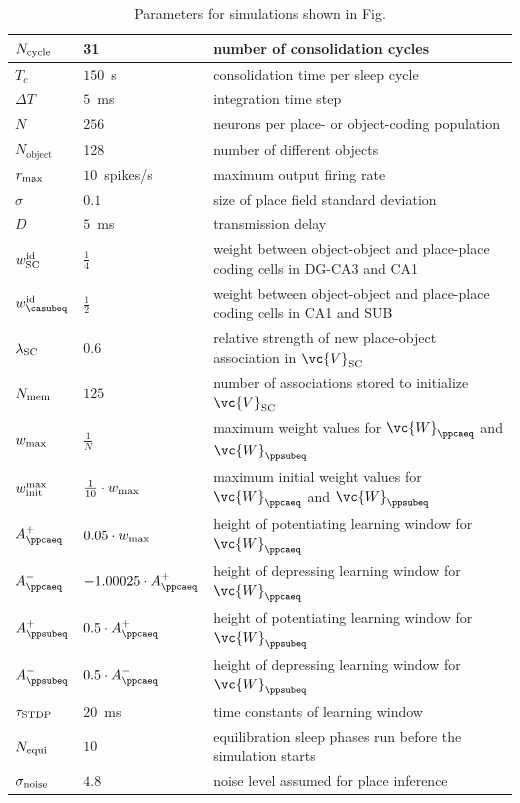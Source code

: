\begin{table}[!ht]
\centering
\renewcommand{\arraystretch}{1.2}
    \begin{tabularx}{\textwidth}{| l | l | X |}
      \hline
      $N_{\rm cycle}$ & 31 & number of consolidation cycles \\ \hline
      $T_c$ & $150$~s & consolidation time per sleep cycle \\ \hline
      $\Delta T$ & $5$~ms & integration time step \\ \hline
      $N$ & $256$ & neurons per place- or object-coding population \\ \hline
      $N_{\mathrm{object}}$ & 128 & number of different objects \\ \hline
      $r_{\rm max}$ & $10$~spikes/s & maximum output firing rate\\ \hline
      $\sigma$ & $0.1$ & size of place field standard deviation\\ \hline
      $D$ & $5$~ms & transmission delay \\ \hline
      $w^{\rm id}_{\rm SC}$ & $\frac{1}{4}$ & weight between object-object and place-place coding cells in DG-CA3 and CA1\\ \hline
      $w^{\rm id}_{\casubeq}$ & $\frac{1}{2}$ & weight between object-object and place-place coding cells in CA1 and SUB \\ \hline
      $\lambda_{\rm SC}$ & $0.6$ & relative strength of new place-object association in $\vc{V}_{\rm SC}$ \\ \hline
      $N_{\rm mem}$ & $125$ & number of associations stored to initialize $\vc{V}_{\rm SC}$ \\ \hline
      $w_{\rm max}$ & $\frac{1}{N}$ & maximum weight values for $\vc{W}_{\ppcaeq}$ and $\vc{W}_{\ppsubeq}$ \\ \hline
	  $w_{\rm init}^{\rm max}$ & $\tfrac{1}{10}\cdot w_{\rm max}$ & maximum initial weight values for $\vc{W}_{\ppcaeq}$ and $\vc{W}_{\ppsubeq}$ \\ \hline
      $A^+_{\ppcaeq}$ & $0.05 \cdot w_{\rm max}$ & height of potentiating learning window for $\vc{W}_{\ppcaeq}$ \\ \hline
      $A^-_{\ppcaeq}$ & $-1.00025 \cdot A^+_{\ppcaeq}$ & height of depressing learning window for $\vc{W}_{\ppcaeq}$ \\ \hline
      $A^+_{\ppsubeq}$ & $ 0.5 \cdot A^+_{\ppcaeq}$ & height of potentiating learning window for $\vc{W}_{\ppsubeq}$ \\ \hline
      $A^-_{\ppsubeq}$ &  $ 0.5 \cdot A^-_{\ppcaeq}$ & height of depressing learning window for $\vc{W}_{\ppsubeq}$ \\ \hline
      $\tau_{\rm STDP}$ & $20$~ms & time constants of learning window \\ \hline
      $N_{\rm equi}$ & $10$ & equilibration sleep phases run before the simulation starts \\ \hline
      $\sigma_{\rm noise}$ & $4.8$ & noise level assumed for place inference \\ \hline
    \end{tabularx}
\caption{Parameters for simulations shown in Fig.\protect{\ref{fig:lesion}}}
\label{tab:remondes}
\end{table}


